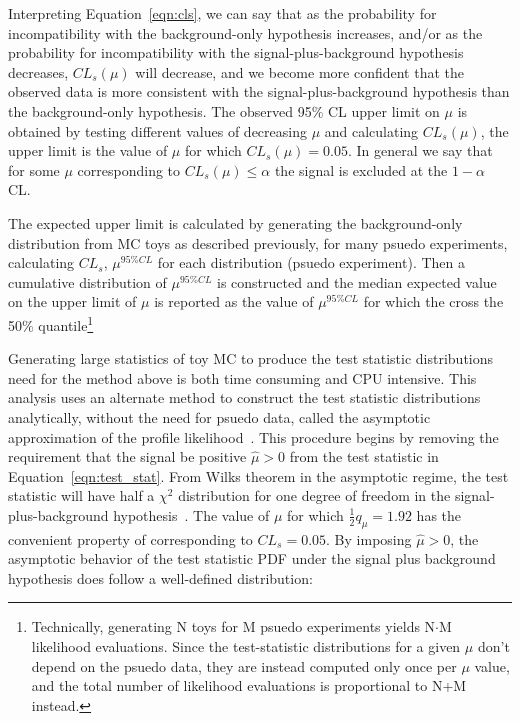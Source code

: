 \noindent Interpreting Equation~\ref{eqn:cls}, we can say that as the probability for incompatibility with the background-only hypothesis increases, and/or as the probability
for incompatibility with the signal-plus-background hypothesis decreases, $CL_{s}(\mu)$ will decrease, and we become more confident that the observed data is more consistent with
the signal-plus-background hypothesis than the background-only hypothesis. The observed 95$\%$ CL upper limit on $\mu$ is obtained by testing different values of decreasing $\mu$ and
calculating $CL_{s}(\mu)$, the upper limit is the value of $\mu$ for which $CL_{s}(\mu) = 0.05$. In general we say that for some $\mu$ corresponding to $CL_{s}(\mu) \leq \alpha$
the signal is excluded at the $1-\alpha$ CL. 

The expected upper limit is calculated by generating the background-only distribution from MC toys as described previously, for many psuedo experiments, calculating $CL_{s}$, $\mu^{95\% CL}$
for each distribution (psuedo experiment). Then a cumulative distribution of $\mu^{95\% CL}$ is constructed and the median expected value on the upper limit of $\mu$ is reported as the value
of $\mu^{95\% CL}$ for which the cross the 50$\%$ quantile\footnote{Technically, generating N toys for M psuedo experiments yields N$\cdot$M likelihood evaluations. Since the test-statistic
distributions for a given $\mu$ don't depend on the psuedo data, they are instead computed only once per $\mu$ value, and the total number of likelihood evaluations is proportional to N+M instead.}

Generating large statistics of toy MC to produce the test statistic distributions need for the method above is both time consuming and CPU intensive. This analysis uses an alternate method to
construct the test statistic distributions analytically, without the need for psuedo data, called the asymptotic approximation of the profile likelihood~\cite{AsymptoticLimits}.  
This procedure begins by removing the requirement that the signal be positive $\hat{\mu} > 0$ from the test statistic in Equation~\ref{eqn:test_stat}. From Wilks theorem
in the asymptotic regime, the test statistic will have half a $\chi^{2}$ distribution for one degree of freedom in the signal-plus-background hypothesis~\cite{wilks}. The value of $\mu$ for which
$\frac{1}{2}q_{\mu} = 1.92$ has the convenient property of corresponding to $CL_{s} = 0.05$. By imposing $\hat{\mu} > 0$, the asymptotic behavior of the test statistic PDF under the signal plus
background hypothesis does follow a well-defined distribution:

